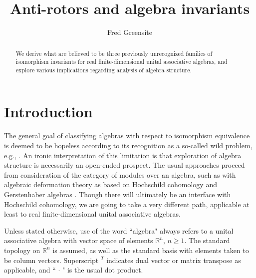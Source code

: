 \documentclass{amsart}
\numberwithin{equation}{section}
\theoremstyle{definition}
\numberwithin{theorem}{section}
\begin{document}
    
    
    
    \title{Anti-rotors and algebra invariants}
    
       \author{Fred Greensite}
 
       \begin{abstract} We derive what are believed to be three previously unrecognized families of isomorphism invariants for real finite-dimensional unital associative algebras, and explore various implications regarding analysis of algebra structure. 
   \end{abstract}
   
    \maketitle
    

\section{Introduction}
The general goal of classifying algebras with respect to isomorphism equivalence is deemed to be hopeless according to its recognition as a so-called wild problem, e.g., \cite{eom:2024,drozd:1972,belitskii:2005}.  An ironic interpretation of this limitation is that exploration of algebra structure is necessarily an open-ended prospect.  
The usual approaches proceed from consideration of the category of modules over an algebra, such as with algebraic deformation theory as based on Hochschild \mbox{cohomology} and Gerstenhaber algebras \cite{hochschild:1945,gerstenhaber:1964}.  Though there will ultimately be an interface with Hochschild cohomology, we are going to take a very different path, applicable at least to real finite-dimensional unital associative algebras.  



Unless stated otherwise, use of the word ``algebra" always refers to a unital associative algebra with vector space of elements $\mathbb{R}^n$, $n\ge 1$.  The standard topology on $\mathbb{R}^n$ is assumed, as well as the standard basis with elements taken to be column vectors.  Superscript $^T$ indicates dual vector or matrix transpose as applicable, and ``$\,\cdot\,$" is the usual dot product.
\end{document}

